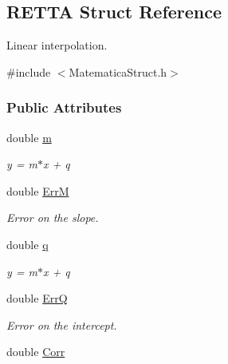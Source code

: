 \hypertarget{structRETTA}{\subsection{\-R\-E\-T\-T\-A \-Struct \-Reference}
\label{structRETTA}
}


\-Linear interpolation.  




{\ttfamily \#include $<$\-Matematica\-Struct.\-h$>$}

\subsubsection*{\-Public \-Attributes}
\begin{DoxyCompactItemize}
\item 
\hypertarget{structRETTA_a5175b356eac1d83a42608b42a25d00b9}{double \hyperlink{structRETTA_a5175b356eac1d83a42608b42a25d00b9}{m}}\label{structRETTA_a5175b356eac1d83a42608b42a25d00b9}

\begin{DoxyCompactList}\small\item\em y = m$\ast$x + q \end{DoxyCompactList}\item 
\hypertarget{structRETTA_a9fb99a6e1b11a7d83154875843000fc8}{double \hyperlink{structRETTA_a9fb99a6e1b11a7d83154875843000fc8}{\-Err\-M}}\label{structRETTA_a9fb99a6e1b11a7d83154875843000fc8}

\begin{DoxyCompactList}\small\item\em \-Error on the slope. \end{DoxyCompactList}\item 
\hypertarget{structRETTA_a5b5e3f03e443adea974601f295136638}{double \hyperlink{structRETTA_a5b5e3f03e443adea974601f295136638}{q}}\label{structRETTA_a5b5e3f03e443adea974601f295136638}

\begin{DoxyCompactList}\small\item\em y = m$\ast$x + q \end{DoxyCompactList}\item 
\hypertarget{structRETTA_a3d2f5c6d85a4ffb02fcf4410f3b049a3}{double \hyperlink{structRETTA_a3d2f5c6d85a4ffb02fcf4410f3b049a3}{\-Err\-Q}}\label{structRETTA_a3d2f5c6d85a4ffb02fcf4410f3b049a3}

\begin{DoxyCompactList}\small\item\em \-Error on the intercept. \end{DoxyCompactList}\item 
\hypertarget{structRETTA_a6f469ce3f1211104f5524db4b5303ed9}{double \hyperlink{structRETTA_a6f469ce3f1211104f5524db4b5303ed9}{\-Corr}}\label{structRETTA_a6f469ce3f1211104f5524db4b5303ed9}


\end{DoxyCompactItemize}
